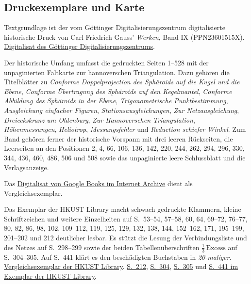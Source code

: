 \subsection*{Druckexemplare und Karte}

Textgrundlage ist der vom Göttinger Digitalisierungszentrum digitalisierte
historische Druck von Carl Friedrich Gauss’ \emph{Werken}, Band IX
(PPN23601515X). \href{https://gdz.sub.uni-goettingen.de/download/pdf/PPN23601515X/PPN23601515X.pdf}{Digitalisat des Göttinger Digitalisierungszentrums}.

Der historische Umfang umfasst die gedruckten Seiten 1--528 mit der
unpaginierten Faltkarte zur hannoverschen Triangulation. Dazu gehören die
Titelblätter zu \emph{Conforme Doppelprojection des Sphäroids auf die Kugel
und die Ebene}, \emph{Conforme Übertragung des Sphäroids auf den
Kegelmantel}, \emph{Conforme Abbildung des Sphäroids in der Ebene},
\emph{Trigonometrische Punktbestimmung}, \emph{Ausgleichung einfacher
Figuren}, \emph{Stationsausgleichungen}, \emph{Zur Netzausgleichung},
\emph{Dreieckskranz um Oldenburg}, \emph{Zur Hannoverschen Triangulation}, \emph{Höhenmessungen}, \emph{Heliotrop},
\emph{Messungsfehler} und \emph{Reduction schiefer Winkel}. Zum Band
gehören ferner der historische Vorspann mit drei leeren Rückseiten, die
Leerseiten an den Positionen 2, 4, 66, 106, 136, 142, 220, 244, 262, 294,
296, 330, 344, 436, 460, 486, 506 und 508 sowie das unpaginierte leere
Schlussblatt und die Verlagsanzeige.

Das \href{https://archive.org/details/carlfriedrichga01gausgoog9}{Digitalisat von Google Books im Internet Archive} dient als Vergleichsexemplar.

Das Exemplar der HKUST Library macht schwach gedruckte Klammern,
kleine Schriftzeichen und weitere Einzelheiten auf S.~53--54, 57--58,
60, 64, 69--72, 76--77, 80, 82, 86, 98, 102, 109--112, 119, 125, 129,
132, 138, 144, 152--162, 171, 195--199, 201--202 und 212 deutlicher
lesbar. Es stützt die Lesung der Verbindungsliste und des Netzes auf
S.~298--299 sowie der beiden Tabellenüberschriften
\(\tfrac13\,\text{Excess}\) auf S.~304--305. Auf S.~441 klärt es den
beschädigten Buchstaben in \emph{20-maliger}.
\href{https://lbezone.hkust.edu.hk/rse/?p=13258}{Vergleichsexemplar der HKUST Library}.
\href{https://lbezone.hkust.edu.hk/obj/4/o/b761099/v9/pg00220.jpg}{S.~212},
\href{https://lbezone.hkust.edu.hk/obj/4/o/b761099/v9/pg00312.jpg}{S.~304},
\href{https://lbezone.hkust.edu.hk/obj/4/o/b761099/v9/pg00313.jpg}{S.~305}
und
\href{https://lbezone.hkust.edu.hk/obj/4/o/b761099/v9/pg00451.jpg}{S.~441
im Exemplar der HKUST Library}.


